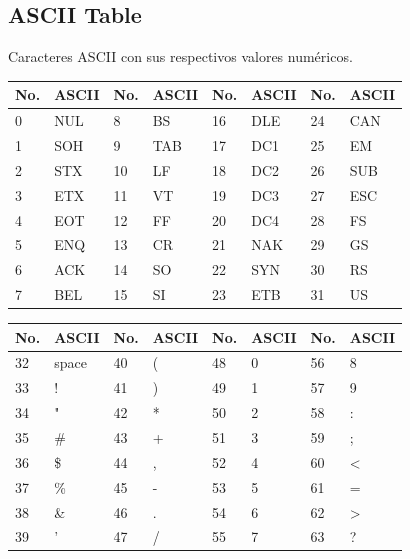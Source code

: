 \documentclass[10pt,landscape,twocolumn,a4paper,notitlepage]{article}
\begin{document}
		\subsection{ASCII Table}
			Caracteres ASCII con sus respectivos valores numéricos.
		\begin{table}[H]
			\begin{tabular}{|l|l|l|l|l|l|l|l|}
				\hline \textbf{No.} & \textbf{ASCII} & \textbf{No.} & \textbf{ASCII}  &
					\textbf{No.} & \textbf{ASCII} & \textbf{No.} & \textbf{ASCII} \\ \hline
				0 & NUL & 8 & BS & 16 & DLE & 24 & CAN  \\ \hline
				1 & SOH & 9 & TAB & 17 & DC1 & 25 & EM  \\ \hline
				2 & STX & 10 & LF & 18 & DC2 & 26 & SUB  \\ \hline
				3 & ETX & 11 & VT & 19 & DC3 & 27 & ESC  \\ \hline
				4 & EOT & 12 & FF & 20 & DC4 & 28 & FS  \\ \hline
				5 & ENQ & 13 & CR & 21 & NAK & 29 & GS  \\ \hline
				6 & ACK & 14 & SO & 22 & SYN & 30 & RS  \\ \hline
				7 & BEL & 15 & SI & 23 & ETB & 31 & US  \\ \hline
			\end{tabular}
		\end{table}
		
		\begin{table}[H]
			\begin{tabular}{|l|l|l|l|l|l|l|l|}
				\hline \textbf{No.} & \textbf{ASCII} & \textbf{No.} & \textbf{ASCII}  &
					\textbf{No.} & \textbf{ASCII} & \textbf{No.} & \textbf{ASCII} \\ \hline
				32 & space & 40 & ( & 48 & 0 & 56 & 8 \\ \hline
				33 &  ! & 41 & ) & 49 & 1 & 57 & 9 \\ \hline
				34 &  " & 42 & * & 50 & 2 & 58 & : \\ \hline
				35 & \# & 43 & + & 51 & 3 & 59 & ; \\ \hline
				36 & \$ & 44 & , & 52 & 4 & 60 & < \\ \hline
				37 & \% & 45 & - & 53 & 5 & 61 & = \\ \hline
				38 & \& & 46 & . & 54 & 6 & 62 & > \\ \hline
				39 &  ' & 47 & / & 55 & 7 & 63 & ? \\ \hline
			\end{tabular}
		\end{table}
		
\end{document}
